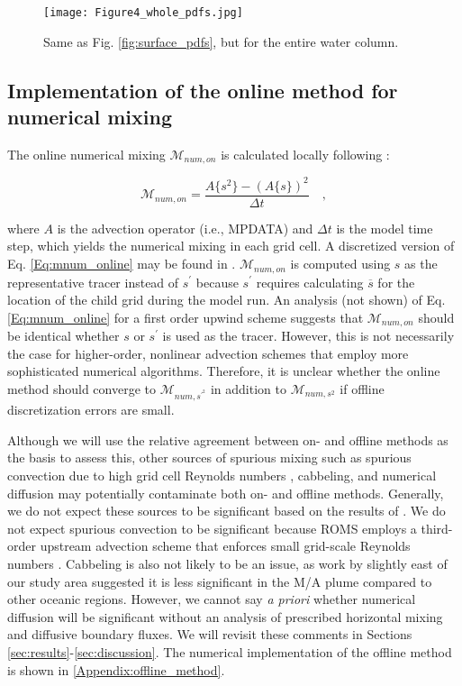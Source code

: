 \documentclass[draft]{agujournal2019}
\begin{document}
\begin{figure}[ht] 
 \centerline{\texttt{[image: Figure4\_whole\_pdfs.jpg]}}
  \caption{Same as Fig. \ref{fig:surface_pdfs}, but for the entire water column.}
  \label{fig:whole_pdfs}
\end{figure}

\subsection{Implementation of the online method for numerical mixing}

The online numerical mixing $\mathcal{M}_{num, on}$ is calculated locally following :
\begin{linenomath*}    
\begin{equation}\label{Eq:mnum_online}
    \mathcal{M}_{num, on} = \frac{A\{ s^2 \}-(A \{s \})^2}{\Delta t} \quad ,
\end{equation}
\end{linenomath*}

where $A$ is the advection operator (i.e., MPDATA) and $\Delta t$ is the model time step, which yields the numerical mixing in each grid cell. A discretized version of Eq. \ref{Eq:mnum_online} may be found in . $\mathcal{M}_{num, on}$ is computed using $s$ as the representative tracer instead of $s^{\prime}$ because $s^{\prime}$ requires calculating $\overline{s}$ for the location of the child grid during the model run. An analysis (not shown) of Eq. \ref{Eq:mnum_online} for a first order upwind scheme suggests that $\mathcal{M}_{num,on}$ should be identical whether $s$ or $s^\prime$ is used as the tracer. However, this is not necessarily the case for higher-order, nonlinear advection schemes that employ more sophisticated numerical algorithms. Therefore, it is unclear whether the online method should converge to $\mathcal{M}_{num, s^{\prime^2}}$ in addition to $\mathcal{M}_{num, s^2}$ if offline discretization errors are small. 

Although we will use the relative agreement between on- and offline methods as the basis to assess this, other sources of spurious mixing such as spurious convection due to high grid cell Reynolds numbers \cite{ilicak2016quantifying, Ilicak_2012}, cabbeling, and numerical diffusion may potentially contaminate both on- and offline methods. Generally, we do not expect these sources to be significant based on the results of . We do not expect spurious convection to be significant because ROMS employs a third-order upstream advection scheme that enforces small grid-scale Reynolds numbers \cite{Ilicak_2012,shchepetkin2005regional}. Cabbeling is also not likely to be an issue, as work by  slightly east of our study area suggested it is less significant in the M/A plume compared to other oceanic regions. However, we cannot say \textit{a priori} whether numerical diffusion will be significant without an analysis of prescribed horizontal mixing and diffusive boundary fluxes. We will revisit these comments in Sections \ref{sec:results}-\ref{sec:discussion}. The numerical implementation of the offline method is shown in \ref{Appendix:offline_method}.
\end{document}
